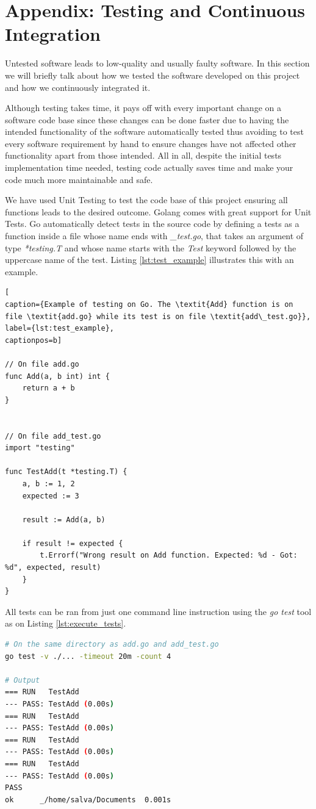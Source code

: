 \newpage
\section{Appendix: Testing and Continuous Integration}
Untested software leads to low-quality and usually faulty software. In this section we will briefly talk about how we tested the software developed on this project and how we continuously integrated it.

Although testing takes time, it pays off with every important change on a software code base since these changes can be done faster due to having the intended functionality of the software automatically tested thus avoiding to test every software requirement by hand to ensure changes have not affected other functionality apart from those intended. All in all, despite the initial tests implementation time needed, testing code actually saves time and make your code much more maintainable and safe.

We have used Unit Testing to test the code base of this project ensuring all functions leads to the desired outcome. Golang comes with great support for Unit Tests. Go automatically detect tests in the source code by defining a tests as a function inside a file whose name ends with \textit{\_test.go}, that takes an argument of type \textit{*testing.T} and whose name starts with the \textit{Test} keyword followed by the uppercase name of the test. Listing \ref{lst:test_example} illustrates this with an example.

\begin{lstlisting}[
caption={Example of testing on Go. The \textit{Add} function is on file \textit{add.go} while its test is on file \textit{add\_test.go}},
label={lst:test_example},
captionpos=b]

// On file add.go 
func Add(a, b int) int {
	return a + b
}


// On file add_test.go
import "testing"

func TestAdd(t *testing.T) {
	a, b := 1, 2
	expected := 3
	
	result := Add(a, b)
	
	if result != expected {
		t.Errorf("Wrong result on Add function. Expected: %d - Got: %d", expected, result)	
	}
}
\end{lstlisting}

All tests can be ran from just one command line instruction using the \textit{go test} tool as on Listing \ref{lst:execute_tests}.

\begin{lstlisting}[language=bash,
caption={Run all tests on this directory and its sub-directories (\textit{./...}) 4 times, with a timeout of 20 minutes.},
label={lst:execute_tests},
captionpos=b]
# On the same directory as add.go and add_test.go
go test -v ./... -timeout 20m -count 4

# Output
=== RUN   TestAdd
--- PASS: TestAdd (0.00s)
=== RUN   TestAdd
--- PASS: TestAdd (0.00s)
=== RUN   TestAdd
--- PASS: TestAdd (0.00s)
=== RUN   TestAdd
--- PASS: TestAdd (0.00s)
PASS
ok  	_/home/salva/Documents	0.001s
\end{lstlisting}

